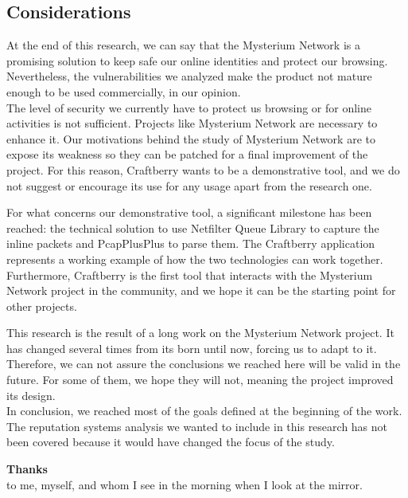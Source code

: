 \documentclass[12pt]{article}
\begin{document}
			\subsection{Considerations}
			At the end of this research, we can say that the Mysterium Network is a promising solution to keep safe our online identities and protect our browsing. Nevertheless, the vulnerabilities we analyzed make the product not mature enough to be used commercially, in our opinion.\\
			The level of security we currently have to protect us browsing or for online activities is not sufficient. Projects like Mysterium Network are necessary to enhance it. Our motivations behind the study of Mysterium Network are to expose its weakness so they can be patched for a final improvement of the project. For this reason, Craftberry wants to be a demonstrative tool, and we do not suggest or encourage its use for any usage apart from the research one.
			
			\bigbreak

			For what concerns our demonstrative tool, a significant milestone has been reached: the technical solution to use Netfilter Queue Library to capture the inline packets and PcapPlusPlus to parse them. The Craftberry application represents a working example of how the two technologies can work together.\\
			Furthermore, Craftberry is the first tool that interacts with the Mysterium Network project in the community, and we hope it can be the starting point for other projects.  

			\bigbreak

			This research is the result of a long work on the Mysterium Network project. It has changed several times from its born until now, forcing us to adapt to it. Therefore, we can not assure the conclusions we reached here will be valid in the future. For some of them, we hope they will not, meaning the project improved its design.\\
			In conclusion, we reached most of the goals defined at the beginning of the work. The reputation systems analysis we wanted to include in this research has not been covered because it would have changed the focus of the study.

	\pagebreak

	{\bfseries\Large Thanks}\\
	to me, myself, and whom I see in the morning when I look at the mirror.

	\pagebreak
\end{document}
